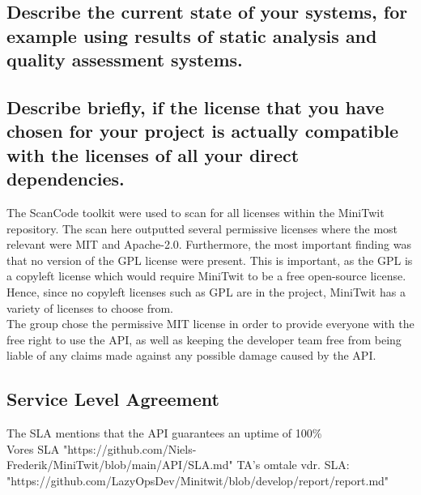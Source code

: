 \subsection{Describe the current state of your systems, for example using results of static analysis and quality assessment systems.}

\subsection{Describe briefly, if the license that you have chosen for your project is actually compatible with the licenses of all your direct dependencies.}
The ScanCode toolkit\cite{scancode} were used to scan for all licenses within the MiniTwit repository. The scan here outputted several permissive licenses where the most relevant were MIT and Apache-2.0. Furthermore, the most important finding was that no version of the GPL license were present. This is important, as the GPL is a copyleft license which would require MiniTwit to be a free open-source license\cite{gpl}. Hence, since no copyleft licenses such as GPL are in the project, MiniTwit has a variety of licenses to choose from.\\
The group chose the permissive MIT license in order to provide everyone with the free right to use the API, as well as keeping the developer team free from being liable of any claims made against any possible damage caused by the API.

\subsection{Service Level Agreement}
The SLA mentions that the API guarantees an uptime of 100\%\\
Vores SLA "https://github.com/Niels-Frederik/MiniTwit/blob/main/API/SLA.md"
TA's omtale vdr. SLA: "https://github.com/LazyOpsDev/Minitwit/blob/develop/report/report.md"
